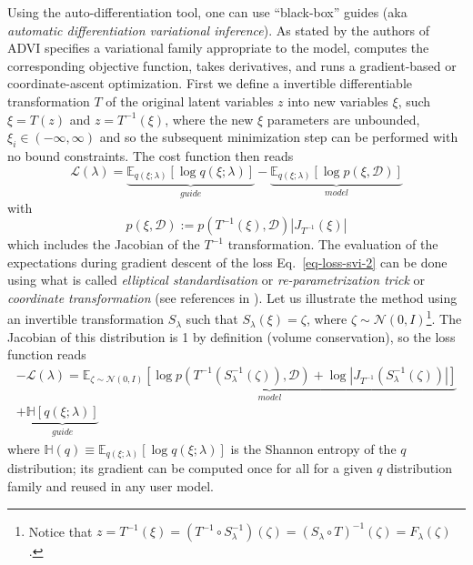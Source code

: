 \documentclass[twocolumn,twocolappendix,nofootinbib,iop]{openjournal}
\newcommand{\numpyro}{\texttt{NumPyro}}
\newcommand{\bydef}{:=}
\begin{document}
Using the auto-differentiation tool, one can use ``black-box'' guides (aka \textit{automatic differentiation variational inference}). As stated by the authors of \citep{10.5555/3122009.3122023} ADVI specifies a variational family appropriate to the model, computes the corresponding objective
function, takes derivatives, and runs a gradient-based or coordinate-ascent optimization. First we define a invertible differentiable transformation $T$ of the original latent variables $z$ into new variables $\xi$, such $\xi=T(z)$ and $z=T^{-1}(\xi)$, where the new $\xi$ parameters are unbounded, $\xi_i \in (-\infty, \infty)$ and so the subsequent minimization step can be performed with no bound constraints. 
The cost function then reads
\begin{equation}
\mathcal{L}(\lambda) = \underbrace{\mathbb{E}_{q(\xi;\lambda)}\left[ \log q(\xi;\lambda)\right]}_{guide} - \underbrace{\mathbb{E}_{q(\xi;\lambda)}\left[ \log p(\xi,\mathcal{D}) \right]}_{model}
\label{eq-loss-svi-2}
\end{equation}
with
\begin{equation}
p(\xi,\mathcal{D}) \bydef p(T^{-1}(\xi),\mathcal{D}) |J_{T^{-1}}(\xi)|
\end{equation}
which includes the Jacobian of the $T^{-1}$ transformation.
The evaluation of the expectations during gradient descent of the loss Eq.~\ref{eq-loss-svi-2} can be done using what is called \textit{elliptical standardisation} or \textit{re-parametrization trick} or \textit{coordinate transformation} (see references in \citealt{10.5555/2969239.2969303}).  Let us illustrate the method using an invertible transformation  $S_\lambda$ such that $S_\lambda(\xi)=\zeta$, where $\zeta\sim \mathcal{N}(0,I)$\footnote{Notice that $z=T^{-1}(\xi)=(T^{-1} \circ S_\lambda^{-1})(\zeta)=(S_\lambda \circ T)^{-1}(\zeta)=F_\lambda(\zeta)$.}. The Jacobian of this distribution is 1 by definition (volume conservation), so the loss function reads
\begin{multline}
-\mathcal{L}(\lambda) = \underbrace{\mathbb{E}_{\zeta\sim \mathcal{N}(0,I)}\left[ \log p(T^{-1}(S_\lambda^{-1}(\zeta)),\mathcal{D}) + \log |J_{T^{-1}}(S_\lambda^{-1}(\zeta))| \right]}_{model} \\ + \underbrace{\mathbb{H}[q(\xi;\lambda)]}_{guide}
\label{eq-loss-svi-3}
\end{multline}
where $\mathbb{H}(q)\equiv \mathbb{E}_{q(\xi;\lambda)}\left[ \log q(\xi;\lambda)\right]$ is the Shannon entropy of the $q$ distribution; its gradient can be computed once for all for a given $q$ distribution family and reused in any user model.  
\end{document}

